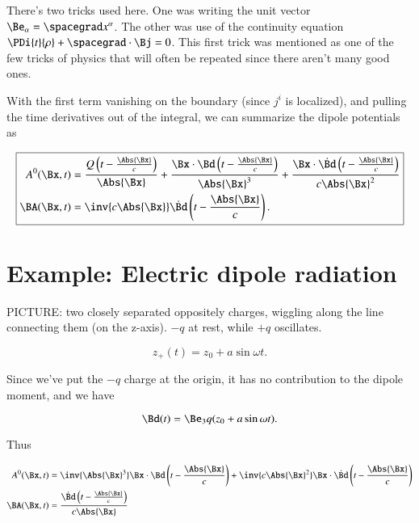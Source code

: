 There's two tricks used here.  One was writing the unit vector $\Be_\alpha = \spacegrad x^\alpha$.  The other was use of the continuity equation $\PDi{t}{\rho} + \spacegrad \cdot \Bj = 0$.  This first trick was mentioned as one of the few tricks of physics that will often be repeated since there aren't many good ones.

With the first term vanishing on the boundary (since $j^i$ is localized), and pulling the time derivatives out of the integral, we can summarize the dipole potentials as

\begin{equation}\label{eqn:relativisticElectrodynamicsL20:250}
\boxed{
\begin{aligned}
A^0(\Bx, t) &= \frac{Q\left(t - \frac{\Abs{\Bx} }{c}\right)}{\Abs{\Bx} } + \frac{\Bx \cdot \Bd\left(t - \frac{\Abs{\Bx} }{c}\right)}{\Abs{\Bx}^3} + \frac{\Bx \cdot \dot{\Bd}\left(t - \frac{\Abs{\Bx} }{c}\right)}{c \Abs{\Bx}^2} \\
\BA(\Bx, t) &= \inv{c \Abs{\Bx} } \dot{\Bd}\left(t - \frac{\Abs{\Bx} }{c}\right).
\end{aligned}
}
\end{equation}

\section{Example: Electric dipole radiation}

PICTURE: two closely separated oppositely charges, wiggling along the line connecting them (on the z-axis).  $-q$ at rest, while $+q$ oscillates.

\begin{equation}\label{eqn:relativisticElectrodynamicsL20:270}
z_+(t) = z_0 + a \sin\omega t.
\end{equation}

Since we've put the $-q$ charge at the origin, it has no contribution to the dipole moment, and we have

\begin{equation}\label{eqn:relativisticElectrodynamicsL20:290}
\Bd(t) = \Be_3 q (z_0 + a \sin\omega t).
\end{equation}

Thus

\begin{align}\label{eqn:relativisticElectrodynamicsL20:310}
A^0(\Bx, t) &= \inv{\Abs{\Bx}^3} \Bx \cdot \Bd\left(t - \frac{\Abs{\Bx} }{c}\right) + \inv{c \Abs{\Bx}^2} \Bx \cdot \dot{\Bd}\left(t - \frac{\Abs{\Bx} }{c}\right) \\
\BA(\Bx, t) &= \frac{\dot{\Bd}\left(t - \frac{\Abs{\Bx} }{c}\right)}{c \Abs{\Bx} }
\end{align}

